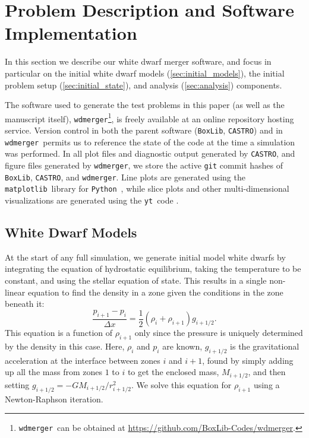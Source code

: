 \documentclass[iop]{../emulateapj}
\newcommand{\boxlib}{\texttt{BoxLib}}
\newcommand{\castro}{\texttt{CASTRO}}
\newcommand{\wdmerger}{\texttt{wdmerger}}
\newcommand{\python}{\texttt{Python}}
\newcommand{\matplotlib}{\texttt{matplotlib}}
\newcommand{\yt}{\texttt{yt}}
\begin{document}
\section{Problem Description and Software Implementation}
\label{sec:implementation}

In this section we describe our white dwarf merger software, and focus in 
particular on the initial white dwarf models (\autoref{sec:initial_models}), 
the initial problem setup (\autoref{sec:initial_state}), and analysis 
(\autoref{sec:analysis}) components.

The software used to generate the test problems in this paper
(as well as the manuscript itself),
\wdmerger\footnote{\wdmerger\ can be obtained at \url{https://github.com/BoxLib-Codes/wdmerger}.},
is freely available at an online repository hosting service.
Version control in both the parent software (\boxlib, \castro) and in \wdmerger\
permits us to reference the state of the code at the time a simulation
was performed. In all plot files and diagnostic output generated by \castro, 
and figure files generated by \wdmerger,
we store the active \texttt{git} commit hashes of \boxlib, \castro, and \wdmerger.
Line plots are generated using the \matplotlib\ library for \python\ 
\citep{matplotlib}, while slice plots and other multi-dimensional visualizations are 
generated using the \yt\ code \citep{yt}.

\subsection{White Dwarf Models}
\label{sec:initial_models}

At the start of any full simulation, we generate initial model white
dwarfs by integrating the equation of hydrostatic equilibrium, taking
the temperature to be constant, and using the
stellar equation of state.  This results in a single non-linear
equation to find the density in a zone given the conditions in the
zone beneath it:
\begin{equation}
\frac{p_{i+1} - p_i}{\Delta x} = \frac{1}{2} (\rho_i + \rho_{i+1}) g_{i+1/2}.
\end{equation}
This equation is a function of $\rho_{i+1}$ only since the pressure is
uniquely determined by the density in this case. Here, $\rho_i$ and $p_i$
are known, $g_{i+1/2}$ is the gravitational acceleration at the
interface between zones $i$ and $i+1$, found by simply adding up all
the mass from zones $1$ to $i$ to get the enclosed mass,
$M_{i+1/2}$, and then setting $g_{i+1/2} =
-GM_{i+1/2}/r_{i+1/2}^2$. We solve this equation for $\rho_{i+1}$
using a Newton-Raphson iteration.
\end{document}
